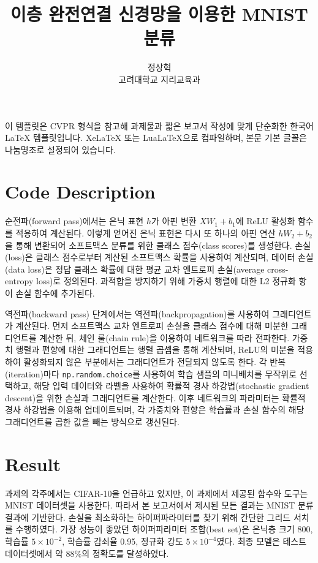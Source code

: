 \documentclass[10pt,twocolumn,letterpaper]{article}
\title{이층 완전연결 신경망을 이용한 MNIST 분류}
\author{정상혁\\고려대학교 지리교육과\\\email{nacl31566@korea.ac.kr}}
\begin{document}
\maketitle
{}
\small
이 템플릿은 CVPR 형식을 참고해 과제물과 짧은 보고서 작성에 맞게 단순화한 한국어 \LaTeX{} 템플릿입니다. XeLaTeX 또는 LuaLaTeX으로 컴파일하며, 본문 기본 글꼴은 나눔명조로 설정되어 있습니다.
\normalsize

\section{Code Description}

순전파(forward pass)에서는 은닉 표현 \(h\)가 아핀 변환 \(XW_1 + b_1\)에 ReLU 활성화 함수를 적용하여 계산된다. 이렇게 얻어진 은닉 표현은 다시 또 하나의 아핀 연산 \(hW_2 + b_2\)을 통해 변환되어 소프트맥스 분류를 위한 클래스 점수(class scores)를 생성한다. 손실(loss)은 클래스 점수로부터 계산된 소프트맥스 확률을 사용하여 계산되며, 데이터 손실(data loss)은 정답 클래스 확률에 대한 평균 교차 엔트로피 손실(average cross-entropy loss)로 정의된다. 과적합을 방지하기 위해 가중치 행렬에 대한 L2 정규화 항이 손실 함수에 추가된다.

역전파(backward pass) 단계에서는 역전파(backpropagation)를 사용하여 그래디언트가 계산된다. 먼저 소프트맥스 교차 엔트로피 손실을 클래스 점수에 대해 미분한 그래디언트를 계산한 뒤, 체인 룰(chain rule)을 이용하여 네트워크를 따라 전파한다. 가중치 행렬과 편향에 대한 그래디언트는 행렬 곱셈을 통해 계산되며, ReLU의 미분을 적용하여 활성화되지 않은 부분에서는 그래디언트가 전달되지 않도록 한다. 각 반복(iteration)마다 \texttt{np.random.choice}를 사용하여 학습 샘플의 미니배치를 무작위로 선택하고, 해당 입력 데이터와 라벨을 사용하여 확률적 경사 하강법(stochastic gradient descent)을 위한 손실과 그래디언트를 계산한다. 이후 네트워크의 파라미터는 확률적 경사 하강법을 이용해 업데이트되며, 각 가중치와 편향은 학습률과 손실 함수의 해당 그래디언트를 곱한 값을 빼는 방식으로 갱신된다.

\section{Result}

과제의 각주에서는 CIFAR-10을 언급하고 있지만, 이 과제에서 제공된 함수와 도구는 MNIST 데이터셋을 사용한다. 따라서 본 보고서에서 제시된 모든 결과는 MNIST 분류 결과에 기반한다. 손실을 최소화하는 하이퍼파라미터를 찾기 위해 간단한 그리드 서치를 수행하였다. 가장 성능이 좋았던 하이퍼파라미터 조합(best set)은 은닉층 크기 800, 학습률 \(5\times10^{-2}\), 학습률 감쇠율 0.95, 정규화 강도 \(5\times10^{-4}\)였다. 최종 모델은 테스트 데이터셋에서 약 88\%의 정확도를 달성하였다.
\end{document}

